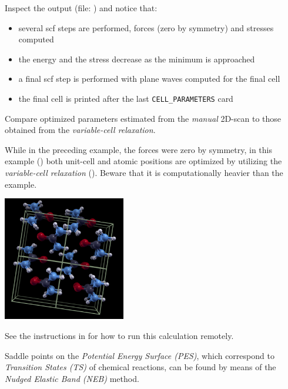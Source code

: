 \documentclass[landscape]{foils}
\begin{document}
Inspect the output (file: ) and notice that:
\vspace{-1em}
\begin{itemize}
  \item several scf steps are performed, forces (zero by symmetry) 
    and stresses computed
    \vspace{-1em}
  \item the energy and the stress decrease as the minimum is approached
    \vspace{-1em}
  \item a final scf step is performed with plane waves computed for
    the final cell
    \vspace{-1em}
  \item the final cell is printed after the last \texttt{CELL\_PARAMETERS}
    card
  \end{itemize}
  Compare optimized parameters estimated from the {\em manual} 2D-scan
  to those obtained from the  {\em variable-cell relaxation}.


While in the preceding example, the forces were zero by symmetry, in
this example () both unit-cell and atomic
positions are optimized by utilizing the {\em variable-cell
  relaxation} ().  Beware that it is
computationally heavier than the  example.
\begin{center}
  \includegraphics[width=0.4\textwidth]{figs/urea.png}
\end{center}
See the instructions in  for how to run this
calculation remotely.

%
Saddle points on the {\em Potential Energy Surface (PES)}, which
correspond to {\em Transition States (TS)} of chemical reactions, can
be found by means of the {\em Nudged Elastic Band (NEB)} method.
\end{document}
